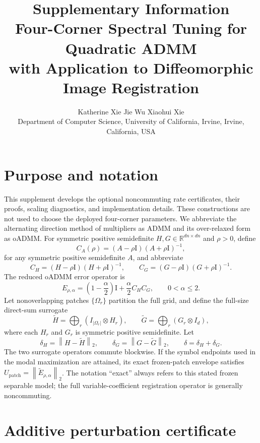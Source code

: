 \documentclass[11pt]{article}
\title{\textbf{Supplementary Information}\\
Four-Corner Spectral Tuning for Quadratic ADMM\\
with Application to Diffeomorphic Image Registration}
\author{Katherine Xie \qquad Jie Wu \qquad Xiaohui Xie\\
\normalsize Department of Computer Science, University of California, Irvine,
Irvine, California, USA}
\date{}
\newcommand{\R}{\mathbb{R}}
\newcommand{\norm}[1]{\left\lVert #1\right\rVert}
\newcommand{\Id}{\mathrm{I}}
\newcommand{\Ulfa}{U_{\mathrm{patch}}}
\begin{document}
\maketitle

\section{Purpose and notation}
This supplement develops the optional noncommuting rate certificates, their
proofs, scaling diagnostics, and implementation details. These constructions
are not used to choose the deployed four-corner parameters. We abbreviate the
alternating direction method of multipliers as ADMM and its over-relaxed form
as oADMM. For symmetric
positive semidefinite $H,G\in\R^{dn\times dn}$ and $\rho>0$, define
\[
C_A(\rho)=(A-\rho\Id)(A+\rho\Id)^{-1},
\]
for any symmetric positive semidefinite $A$, and abbreviate
\[
C_H=(H-\rho\Id)(H+\rho\Id)^{-1},\qquad
C_G=(G-\rho\Id)(G+\rho\Id)^{-1}.
\]
The reduced oADMM error operator is
\begin{equation}
E_{\rho,\alpha}=
\left(1-\frac{\alpha}{2}\right)\Id+\frac{\alpha}{2}C_HC_G,
\qquad 0<\alpha\le2.
\label{eq:E}
\end{equation}
Let nonoverlapping patches $\{\Omega_r\}$ partition the full grid, and define
the full-size direct-sum surrogate
\[
\widetilde H=\bigoplus_r(I_{|\Omega_r|}\otimes H_r),\qquad
\widetilde G=\bigoplus_r(G_r\otimes I_d),
\]
where each $H_r$ and $G_r$ is symmetric positive semidefinite. Let
\[
\delta_H=\norm{H-\widetilde H}_2,\qquad
\delta_G=\norm{G-\widetilde G}_2,\qquad
\delta=\delta_H+\delta_G.
\]
The two surrogate operators commute blockwise. If the symbol endpoints used in
the modal maximization are attained, its exact frozen-patch envelope satisfies
$\Ulfa=\norm{\widetilde E_{\rho,\alpha}}_2$. The notation ``exact'' always
refers to this stated frozen separable model; the full variable-coefficient
registration operator is generally noncommuting.

\section{Additive perturbation certificate}\label{sec:additive}
\end{document}
